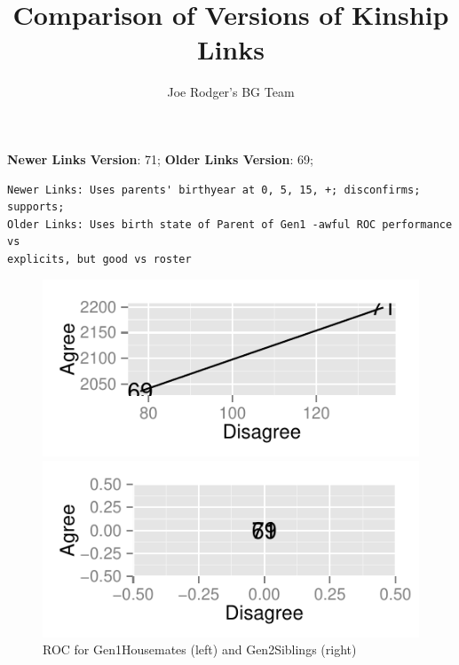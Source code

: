 \documentclass[a4paper]{article}\usepackage{graphicx, color}
\title{Comparison of Versions of Kinship Links}
\author{Joe Rodger's BG Team}
\makeatletter
\def\maxwidth{ %
  \ifdim\Gin@nat@width>\linewidth
    \linewidth
  \else
    \Gin@nat@width
  \fi
}
\newenvironment{kframe}{%
 \def\at@end@of@kframe{}%
 \ifinner\ifhmode%
  \def\at@end@of@kframe{\end{minipage}}%
  \begin{minipage}{\columnwidth}%
 \fi\fi%
 \def\FrameCommand##1{\hskip\@totalleftmargin \hskip-\fboxsep
 \colorbox{shadecolor}{##1}\hskip-\fboxsep
     \hskip-\linewidth \hskip-\@totalleftmargin \hskip\columnwidth}%
 \MakeFramed {\advance\hsize-\width
   \@totalleftmargin\z@ \linewidth\hsize
   \@setminipage}}%
 {\par\unskip\endMakeFramed%
 \at@end@of@kframe}
\newenvironment{knitrout}{}{} %
\makeatother
\begin{document}
\maketitle

\setlength{\parindent}{0pt}%







\textbf{Newer Links Version}: 71;
\textbf{Older Links Version}: 69;

\begin{knitrout}
\color{fgcolor}\begin{kframe}
\begin{verbatim}
Newer Links: Uses parents' birthyear at 0, 5, 15, +; disconfirms; supports;
Older Links: Uses birth state of Parent of Gen1 -awful ROC performance vs
explicits, but good vs roster
\end{verbatim}
\end{kframe}
\end{knitrout}


\begin{figure}[htbp]
\begin{knitrout}
\color{fgcolor}
\includegraphics[width=\maxwidth]{figure/unnamed-chunk-31} 

\includegraphics[width=\maxwidth]{figure/unnamed-chunk-32} 

\end{knitrout}

\caption{ROC for Gen1Housemates (left) and Gen2Siblings (right)}
\end{figure}
\end{document}
